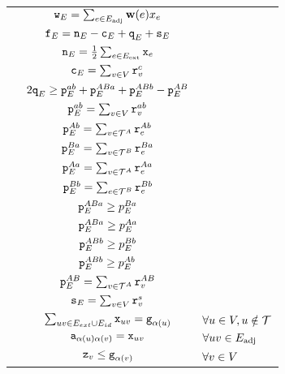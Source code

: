 \begin{algorithm}[tbh]
\begin{constraints}
\begin{tabular}{lcl}
    \cns\label{c:beginform} & ${\texttt{w}}_E = \sum_{e \in {E}_\text{adj}} \mathbf{w}(e) x_e$\\
	\cns & ${\texttt{f}}_E = {\texttt{n}}_E - {\texttt{c}}_E + {\texttt{q}}_E + {\texttt{s}}_E$\\
    \cns & ${\texttt{n}}_E = \frac{1}{2} \sum_{e \in {E}_{\text{ext}}} {\texttt{x}}_{e}$\\
    \cns & ${\texttt{c}}_E = \sum_{v\in V} {\texttt{r}}^c_v$\\
    \cns\label{c:endform} & $2{\texttt{q}}_E \geq {\texttt{p}}^{a b}_E+ {\texttt{p}}^{ABa}_E + {\texttt{p}}^{ABb}_E - {\texttt{p}}^{A B}_E $\\
    \cns\label{c:beginsum} & ${\texttt{p}}^{a b}_E = \sum_{v \in V}{\texttt{r}}^{a b}_v$\\
    \cns & ${\texttt{p}}^{A b}_E = \sum_{v \in \mathcal{T}^A} {\texttt{r}}^{A b}_e$\\
    \cns & ${\texttt{p}}^{B a}_E = \sum_{v\in \mathcal{T}^B} {\texttt{r}}^{B a}_e$\\
    \cns & ${\texttt{p}}^{A a}_E = \sum_{v \in \mathcal{T}^A} {\texttt{r}}^{A a}_e$\\
    \cns\label{c:endsum} & ${\texttt{p}}^{B b}_E = \sum_{e \in \mathcal{T}^B} {\texttt{r}}^{B b}_e$\\
    \cns\label{c:begingeq} & ${\texttt{p}}^{ABa}_E \geq p^{B a}_E$\\
    \cns & ${\texttt{p}}^{ABa}_E \geq p^{A a}_E$\\
    \cns & ${\texttt{p}}^{ABb}_E \geq p^{B b}_E$\\
    \cns\label{c:endgeq} & ${\texttt{p}}^{ABb}_E \geq p^{A b}_E$\\
    \cns\label{c:outsum} & ${\texttt{p}}^{A B}_E = \sum_{v\in \mathcal{T}^A} {\texttt{r}}^{A B}_v$\\
    \cns & ${\texttt{s}}_E = \sum_{v\in V} {\texttt{r}}^{s}_{v}$ \\
    \cns\label{c:inheritext} & $\sum_{uv\in E_{ext} \cup E_{id} } {\texttt{x}}_{uv}= {\texttt{g}}_{\alpha(u)}$ & $\forall u\in V, u\notin \mathcal{T}$  \\
    \cns\label{c:inheritadj} & ${\texttt{a}}_{\alpha(u)\alpha(v)} = {\texttt{x}}_{uv}$ & $\forall uv \in {E}_\text{adj}$ \\
    \cns\label{c:inheritz} & ${\texttt{z}}_{v} \leq {\texttt{g}}_{\alpha (v)}$ & $\forall v \in V$ \\

\end{tabular}
\end{constraints}
\end{algorithm}
